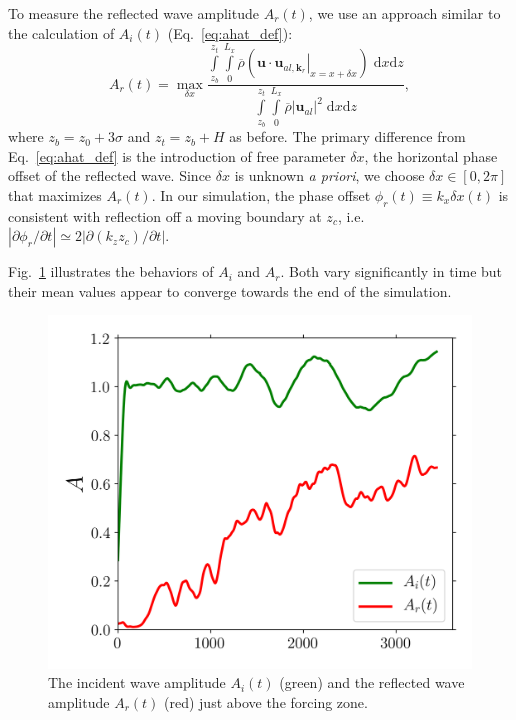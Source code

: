 \documentclass[
        fleqn,
        usenatbib,
    ]{mnras}
\newcommand*{\pdil}[2]{\partial#1/\partial#2}
\newcommand*{\at}[1]{\left.#1\right|}
\newcommand*{\abs}[1]{\left|#1\right|}
\newcommand*{\p}[1]{\left(#1\right)}
\newcommand*{\bm}[1]{\mathbf{#1}}
\begin{document}
To measure the reflected wave amplitude $A_r(t)$, we use an approach similar to
the calculation of $A_i(t)$ (Eq.~\eqref{eq:ahat_def}):
\begin{equation}
    A_r(t) = \max_{\delta x}\frac{\int\limits_{z_b}^{z_t}\int\limits_0^{L_x}
        \overline{\rho}\p{\bm{u} \cdot \at{\bm{u}_{al,
        \bm{k}_r}}_{x = x + \delta x}}\;\mathrm{d}x\mathrm{d}z}
        {\int\limits_{z_b}^{z_t}\int\limits_0^{L_x}
        \overline{\rho}\abs{\bm{u}_{al}}^2\;\mathrm{d}x\mathrm{d}z},
        \label{eq:ar_def}
\end{equation}
where $z_b = z_0 + 3\sigma$ and $z_t = z_b + H$ as before. The primary
difference from Eq.~\eqref{eq:ahat_def} is the introduction of free parameter
$\delta x$, the horizontal phase offset of the reflected wave. Since $\delta x$
is unknown \emph{a priori}, we choose $\delta x \in [0, 2\pi]$ that maximizes
$A_r(t)$. In our simulation, the phase offset $\phi_r(t) \equiv k_x \delta x(t)
$ is consistent with reflection off a moving boundary at $z_c$,
i.e.\ $\abs{\pdil{\phi_r}{t}} \simeq 2\abs{\pdil{(k_{z}z_c)}{t}}$.

Fig.~\ref{fig:nl_f_amps} illustrates the behaviors of $A_i$ and $A_r$. Both vary
significantly in time but their mean values appear to converge towards the end
of the simulation.
\begin{figure}
    \centering
    \includegraphics[width=0.9\columnwidth]{plots/nl_f_amps.png}
    \caption{The incident wave amplitude $A_i(t)$ (green) and the reflected wave
    amplitude $A_r(t)$ (red) just above the forcing zone.}\label{fig:nl_f_amps}
\end{figure}
\end{document}
